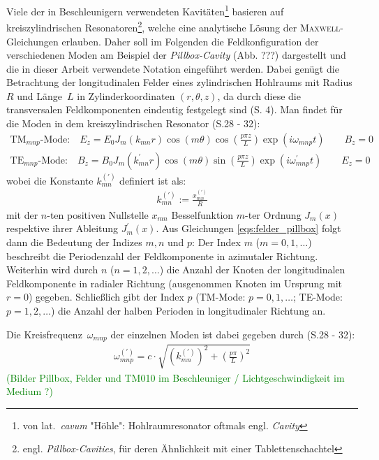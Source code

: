 \documentclass[11pt, a4paper]{scrbook}
\newcommand{\todo}[1]{{\textcolor{Green}{(#1)}}}
\begin{document}
	Viele der in Beschleunigern verwendeten Kavitäten\footnote{von lat.\ \emph{cavum} "Höhle": Hohlraumresonator oftmals engl. \emph{Cavity}} basieren auf kreiszylindrischen Resonatoren\footnote{engl. \emph{Pillbox-Cavities}, für deren Ähnlichkeit mit einer Tablettenschachtel}, welche eine analytische Lösung der \textsc{Maxwell}-Gleichungen erlauben.
	Daher soll im Folgenden die Feldkonfiguration der verschiedenen Moden am Beispiel der \emph{Pillbox-Cavity} (Abb. ???) dargestellt und die in dieser Arbeit verwendete Notation eingeführt werden.
	Dabei genügt die Betrachtung der longitudinalen Felder eines zylindrischen Hohlraums mit Radius~$R$ und Länge~$L$ in Zylinderkoordinaten $(r, \theta, z)$, da durch diese die transversalen Feldkomponenten eindeutig festgelegt sind \cite{hillert} (S. 4).
	Man findet für die Moden in dem kreiszylindrischen Resonator \cite{wangler} (S.28 - 32):
	\begin{subequations}
		\begin{align}
		\mathrm{TM}_{mnp}\text{-Mode:} \quad E_z = E_0 J_m(k_{mn} r) \cos(m \theta) \cos\left(\frac{p \pi z}{L}\right) \exp(i \omega_{mnp} t) \qquad B_z = 0\\
		\mathrm{TE}_{mnp}\text{-Mode:} \quad B_z = B_0 J_m(k_{mn}^\prime r) \cos(m \theta) \sin\left(\frac{p \pi z}{L}\right) \exp(i \omega_{mnp}^\prime t) \qquad  E_z = 0
		\end{align}
		\label{eqs:felder_pillbox}
	\end{subequations}
	wobei die Konstante $k_{mn}^{(\prime)}$ definiert ist als:
	\begin{align}
	k_{mn}^{(\prime)} := \frac{x_{mn}^{(\prime)}}{R}
	\end{align}
	mit der $n$-ten positiven Nullstelle $x_{mn}$ Besselfunktion $m$-ter Ordnung $J_m(x)$ respektive ihrer Ableitung $J_m^\prime(x)$.
	Aus Gleichungen \eqref{eqs:felder_pillbox} folgt dann die Bedeutung der Indizes $m, n$ und $p$:
	Der Index $m$ ($m=0, 1, \dots$) beschreibt die Periodenzahl der Feldkomponente in azimutaler Richtung.
	Weiterhin wird durch $n$ ($n=1, 2, \dots$) die Anzahl der Knoten der longitudinalen Feldkomponente in radialer Richtung (ausgenommen Knoten im Ursprung mit $r=0$) gegeben.
	Schließlich gibt der Index $p$ (TM-Mode: $p= 0, 1, \dots$; TE-Mode: $p = 1, 2, \dots$) die Anzahl der halben Perioden in longitudinaler Richtung an.
	
	Die Kreisfrequenz~$\omega_{mnp}$ der einzelnen Moden ist dabei gegeben durch \cite{wangler} (S.28 - 32):
	\begin{align}
	\omega_{mnp}^{(\prime)} = c \cdot \sqrt{\left( k_{mn}^{(\prime)}\right)^2 + \left( \frac{p \pi}{L} \right)^2}
	\end{align}
	\todo{Bilder Pillbox, Felder und TM010 im Beschleuniger / Lichtgeschwindigkeit im Medium ?}
	
\end{document}
